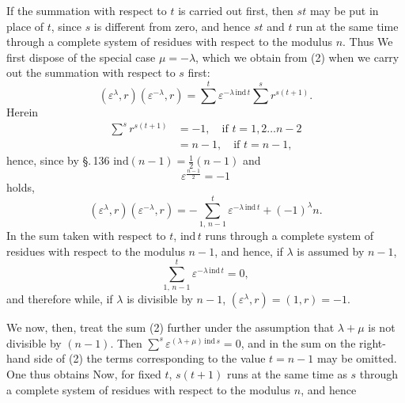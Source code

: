 If the summation with respect to $t$ is carried out first,
then $st$ may be put in place of $t$, since $s$ is different from zero,
and hence $st$ and $t$ run at the same time through a complete system of residues
with respect to the modulus $n$. Thus
We first dispose of the special case $\mu = -\lambda$, which
we obtain from (2) when we carry out the summation with respect to $s$
first:
\[ (\varepsilon^\lambda, r)(\varepsilon^{-\lambda}, r) = \sum^{t} \varepsilon^{-\lambda\,\mathrm{ind}\,t} \sum^{s} r^{s(t+1)}. \]
Herein
\[
\begin{aligned}
\sum^{s} r^{s(t+1)} &= -1, \quad \text{if } t = 1, 2 \ldots n-2\\
&= n-1, \quad \text{if } t = n-1,
\end{aligned}
\]
hence, since by \S.\,136 $\mathrm{ind}(n-1) = \frac{1}{2}(n-1)$ and
\[ \varepsilon^{\frac{n-1}{2}} = -1 \]
holds,
\[ (\varepsilon^\lambda, r)(\varepsilon^{-\lambda}, r) = -\sum_{1,\,n-1}^{t} \varepsilon^{-\lambda\,\mathrm{ind}\,t} + (-1)^\lambda n. \]
In the sum taken with respect to $t$, $\mathrm{ind}\,t$ runs through a complete
system of residues with respect to the modulus $n-1$, and hence, if $\lambda$ is
assumed  by $n-1$,
\[ \sum_{1,\,n-1}^{t} \varepsilon^{-\lambda\,\mathrm{ind}\,t} = 0, \]
and therefore
while, if $\lambda$ is divisible by $n-1$, $(\varepsilon^\lambda, r) = (1, r) = -1$.

We now, then, treat the sum (2) further under the
assumption that $\lambda + \mu$ is not divisible by $(n-1)$.
Then $\sum^{s} \varepsilon^{(\lambda+\mu)\,\mathrm{ind}\,s} = 0$, and in the sum on the
right-hand side of (2) the terms corresponding to the value $t = n-1$
may be omitted. One thus obtains
Now, for fixed $t$, $s(t+1)$ runs at the same time as $s$
through a complete system of residues with respect to the modulus $n$, and hence
